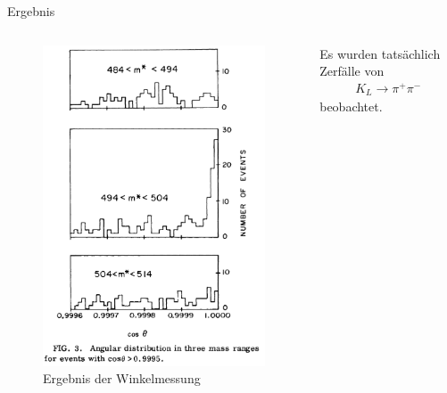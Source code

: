 \documentclass[aspectratio=1610, professionalfonts, 9pt, t]{beamer}
\begin{document}
  \begin{frame}{Ergebnis}
    \begin{columns}[onlytextwidth]
      \begin{column}{0.4\textwidth}
        \begin{figure}[ht]
          \begin{center}
            \includegraphics[height=0.8\textheight]{Images/croninfitch_erg.png}
            \caption{Ergebnis der Winkelmessung}
          \end{center}
        \end{figure}
      \end{column}
      \begin{column}{0.5\textwidth}
        Es wurden tatsächlich Zerfälle von
        \begin{align*}
          K_{L} \rightarrow \pi^{+} \pi^{-}
        \end{align*}
        beobachtet.
      \end{column}
    \end{columns}
  \end{frame}
\end{document}
